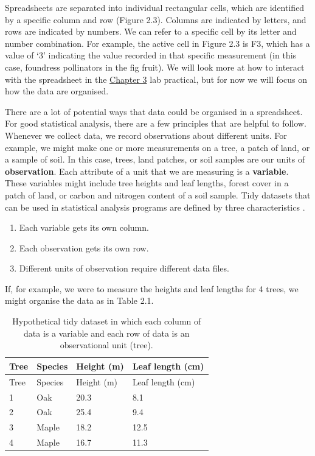 \documentclass[
]{scrbook}
\providecommand{\tightlist}{%
  \setlength{\itemsep}{0pt}\setlength{\parskip}{0pt}}
\begin{document}
Spreadsheets are separated into individual rectangular cells, which are identified by a specific column and row (Figure 2.3).
Columns are indicated by letters, and rows are indicated by numbers.
We can refer to a specific cell by its letter and number combination.
For example, the active cell in Figure 2.3 is F3, which has a value of `3' indicating the value recorded in that specific measurement (in this case, foundress pollinators in the fig fruit).
We will look more at how to interact with the spreadsheet in the \protect\hyperlink{Chapter_3}{Chapter 3} lab practical, but for now we will focus on how the data are organised.

There are a lot of potential ways that data could be organised in a spreadsheet.
For good statistical analysis, there are a few principles that are helpful to follow.
Whenever we collect data, we record observations about different units.
For example, we might make one or more measurements on a tree, a patch of land, or a sample of soil.
In this case, trees, land patches, or soil samples are our units of \textbf{observation}.
Each attribute of a unit that we are measuring is a \textbf{variable}.
These variables might include tree heights and leaf lengths, forest cover in a patch of land, or carbon and nitrogen content of a soil sample.
Tidy datasets that can be used in statistical analysis programs are defined by three characteristics \citep{Wickham2014}.

\begin{enumerate}
\def\labelenumi{\arabic{enumi}.}
\tightlist
\item
  Each variable gets its own column.
\item
  Each observation gets its own row.
\item
  Different units of observation require different data files.
\end{enumerate}

If, for example, we were to measure the heights and leaf lengths for 4 trees, we might organise the data as in Table 2.1.

\begin{longtable}[]{@{}llll@{}}
\caption{Hypothetical tidy dataset in which each column of data is a variable and each row of data is an observational unit (tree).}\tabularnewline
\toprule
Tree & Species & Height (m) & Leaf length (cm) \\
\midrule
\endfirsthead
\toprule
Tree & Species & Height (m) & Leaf length (cm) \\
\midrule
\endhead
1 & Oak & 20.3 & 8.1 \\
2 & Oak & 25.4 & 9.4 \\
3 & Maple & 18.2 & 12.5 \\
4 & Maple & 16.7 & 11.3 \\
\bottomrule
\end{longtable}
\end{document}
